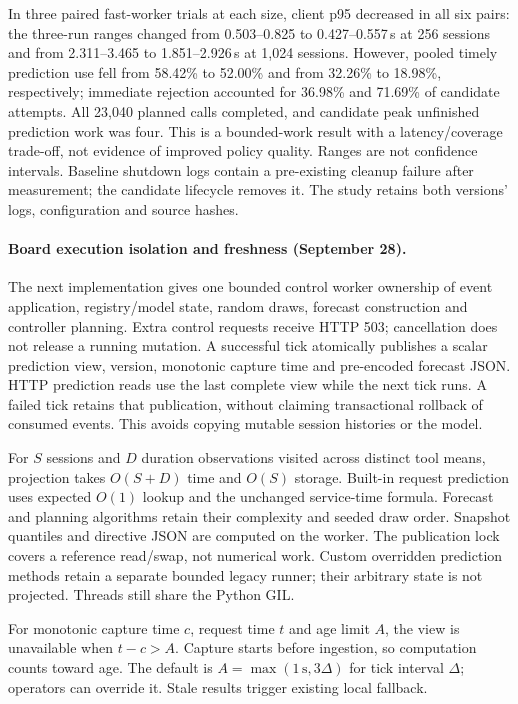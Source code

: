 In three paired fast-worker trials at each size, client p95 decreased in all six
pairs: the three-run ranges changed from 0.503--0.825 to 0.427--0.557\,s at 256
sessions and from 2.311--3.465 to 1.851--2.926\,s at 1,024 sessions. However,
pooled timely prediction use fell from 58.42\% to 52.00\% and from 32.26\% to
18.98\%, respectively; immediate rejection accounted for 36.98\% and 71.69\%
of candidate attempts. All 23,040 planned calls completed, and candidate peak
unfinished prediction work was four. This is a bounded-work result with a
latency/coverage trade-off, not evidence of improved policy quality. Ranges are
not confidence intervals. Baseline shutdown logs contain a pre-existing cleanup
failure after measurement; the candidate lifecycle removes it. The study retains
both versions' logs, configuration and source hashes.

\paragraph{Board execution isolation and freshness (September 28).}
The next implementation gives one bounded control worker ownership of event
application, registry/model state, random draws, forecast construction and
controller planning. Extra control requests receive HTTP 503; cancellation does
not release a running mutation. A successful tick atomically publishes a scalar
prediction view, version, monotonic capture time and pre-encoded forecast JSON.
HTTP prediction reads use the last complete view while the next tick runs.
A failed tick retains that publication, without claiming transactional rollback
of consumed events. This avoids copying mutable session histories or the model.

For $S$ sessions and $D$ duration observations visited across distinct tool means,
projection takes $O(S+D)$ time and $O(S)$ storage. Built-in request prediction
uses expected $O(1)$ lookup and the unchanged service-time formula. Forecast and
planning algorithms retain their complexity and seeded draw order. Snapshot
quantiles and directive JSON are computed on the worker. The publication lock
covers a reference read/swap, not numerical work. Custom overridden prediction
methods retain a separate bounded legacy runner; their arbitrary state is not
projected. Threads still share the Python GIL.

For monotonic capture time $c$, request time $t$ and age limit $A$, the view is
unavailable when $t-c>A$. Capture starts before ingestion, so computation counts
toward age. The default is $A=\max(1\,\mathrm{s},3\Delta)$ for tick interval
$\Delta$; operators can override it. Stale results trigger existing local fallback.

